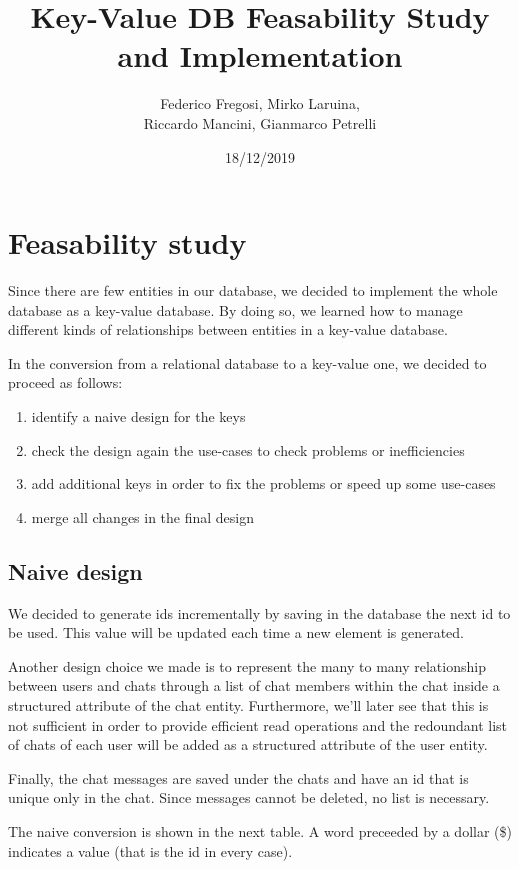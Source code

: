 \documentclass[10pt]{article}
\title{Key-Value DB Feasability Study and Implementation}
\date{18/12/2019}
\author{Federico Fregosi, Mirko Laruina,\\
        Riccardo Mancini, Gianmarco Petrelli}
\begin{document}
\maketitle
\vfill
\setcounter{tocdepth}{2}
\tableofcontents
\vfill
\clearpage
\setcounter{page}{1}

\section{Feasability study}

Since there are few entities in our database, we decided to implement the whole 
database as a key-value database. By doing so, we learned how to manage different
kinds of relationships between entities in a key-value database.

In the conversion from a relational database to a key-value one, we decided to 
proceed as follows:
\begin{enumerate}
    \item identify a naive design for the keys
    \item check the design again the use-cases to check problems or 
        inefficiencies
    \item add additional keys in order to fix the problems or speed up some use-cases
    \item merge all changes in the final design
\end{enumerate}

\subsection{Naive design}
We decided to generate ids incrementally by saving in the database the next id
to be used. This value will be updated each time a new element is generated.

Another design choice we made is to represent the many to many relationship 
between users and chats through a list of chat members within the chat inside 
a structured attribute of the chat entity. 
Furthermore, we'll later see that this is not sufficient in order to provide 
efficient read operations and the redoundant list of chats of each user will 
be added as a structured attribute of the user entity.

Finally, the chat messages are saved under the chats and have an id that is 
unique only in the chat. Since messages cannot be deleted, no list is necessary.

The naive conversion is shown in the next table. A word preceeded by a dollar 
(\$) indicates a value (that is the id in every case).
\end{document}
